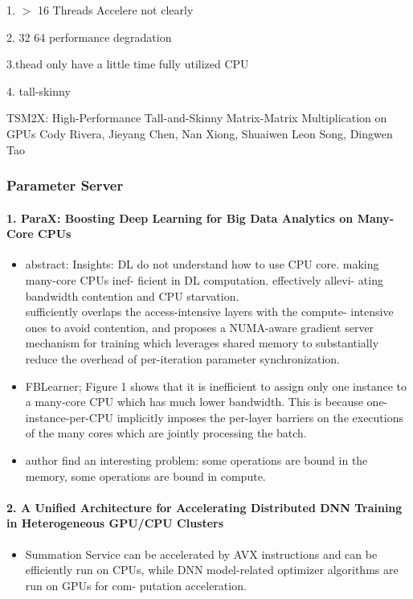 \documentclass[UTF8]{article}
\begin{document}
1. $>$ 16 Threads Accelere not clearly 

2. 32 64 performance degradation 

3.thead only have a little time fully utilized CPU

4. tall-skinny

TSM2X: High-Performance Tall-and-Skinny Matrix-Matrix Multiplication on GPUs
Cody Rivera, Jieyang Chen, Nan Xiong, Shuaiwen Leon Song, Dingwen Tao

 
\subsubsection{Parameter Server}
\paragraph{1. ParaX: Boosting Deep Learning for Big Data Analytics on Many-Core CPUs}
\begin{itemize}
	\item abstract: Insights: DL do not understand how to use CPU core. making many-core CPUs inef- ficient in DL computation.  effectively allevi- ating bandwidth contention and CPU starvation.\\ sufficiently overlaps the access-intensive layers with the compute- intensive ones to avoid contention, and proposes a NUMA-aware gradient server mechanism for training which leverages shared memory to substantially reduce the overhead of per-iteration parameter synchronization. 
	\item FBLearner; Figure 1 shows that it is inefficient to assign only one instance to a many-core CPU which has much lower bandwidth. This is because one-instance-per-CPU implicitly imposes the per-layer barriers on the executions of the many cores which are jointly processing the batch.
	\item author find an interesting problem: some operations are bound in the memory, some operations are bound in compute.  
\end{itemize}
\paragraph{2. A Unified Architecture for Accelerating Distributed DNN Training in Heterogeneous GPU/CPU Clusters}
\begin{itemize}
	\item Summation Service can be accelerated by AVX instructions and can be efficiently run on CPUs, while DNN model-related optimizer algorithms are run on GPUs for com- putation acceleration.
\end{itemize}
\end{document}
